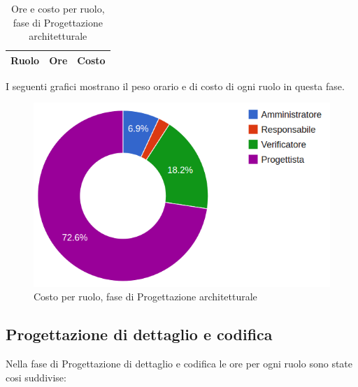 \begin{table}[H]
	\centering
	\begin{tabular}{ l c c }
	\textbf{Ruolo} & \textbf{Ore} & \textbf{Costo} \\
	\hline
	
		
	
	\end{tabular}
	\caption{Ore e costo per ruolo, fase di Progettazione architetturale}
	\end{table}
	
I seguenti grafici mostrano il peso orario e di costo di ogni ruolo in questa fase.

\begin{tikzpicture}

	

\end{tikzpicture}


\begin{figure}[H]
\centering
\includegraphics[scale=0.4]{5-2-2.png}
\caption{Costo per ruolo, fase di Progettazione architetturale\label{fig:nome}}
\end{figure}

\subsection{Progettazione di dettaglio e codifica}

Nella fase di Progettazione di dettaglio e codifica le ore per ogni ruolo sono state cosi suddivise:

